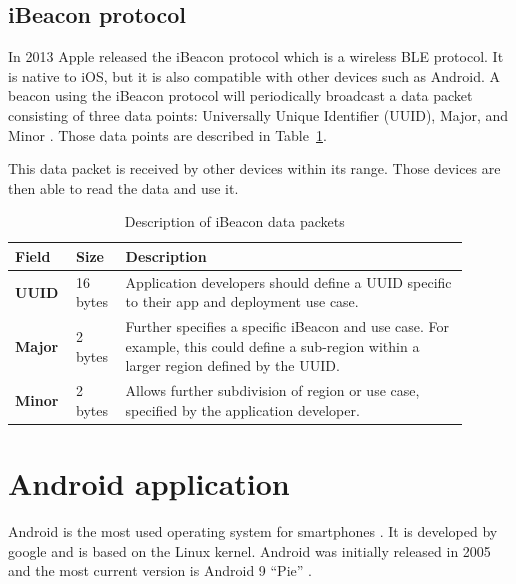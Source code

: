 \documentclass[../Main/thesis.tex]{subfiles}
\begin{document}
\subsection{iBeacon protocol}
In 2013 Apple released the iBeacon protocol which is a wireless BLE protocol.
It is native to iOS, but it is also compatible with other devices such as Android.
A beacon using the iBeacon protocol will periodically broadcast a data packet consisting of three data points: Universally Unique Identifier (UUID), Major, and Minor \citep{Apple2014}.
Those data points are described in Table~\ref{tab:iBeacon-protocol}.

This data packet is received by other devices within its range. 
Those devices are then able to read the data and use it.

\begin{table}[h]
\centering
\caption[Description of iBeacon data packets]{Description of iBeacon data packets\citep[p. 3]{Apple2014}}
\begin{tabular}{|p{0.1\linewidth}|p{0.1\linewidth}|p{0.7\linewidth}|}
\hline
\textbf{Field} & \textbf{Size} & \textbf{Description}                                                                                                                       \\ \hline
\textbf{UUID}  & 16 bytes      & Application developers should define a UUID specific to their app and deployment use case.                                                 \\ \hline
\textbf{Major} & 2 bytes       & Further specifies a specific iBeacon and use case. For example, this could define a sub-region within a larger region defined by the UUID. \\ \hline
\textbf{Minor} & 2 bytes       & Allows further subdivision of region or use case, specified by the application developer.                                                  \\ \hline
\end{tabular}
\label{tab:iBeacon-protocol}
\end{table}

\section{Android application}
Android is the most used operating system for smartphones \citep{osmarketshare}. 
It is developed by google and is based on the Linux kernel.
Android was initially released in 2005 \citep{Morrill2008a} and the most current version is Android 9 ``Pie'' \cite{Samat2018}.
\end{document}
